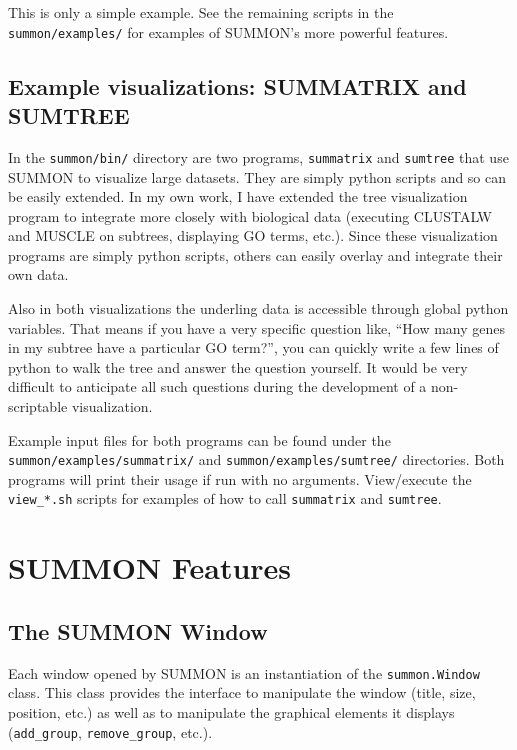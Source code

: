 \documentclass[12pt]{article}
\newcommand{\code}[1]{{\tt #1}}
\newcommand{\comment}[1]{}
\begin{document}
This is only a simple example.  See the remaining scripts in the 
\code{summon/examples/} for examples of SUMMON's more powerful features.



\subsection{Example visualizations: SUMMATRIX and SUMTREE}

In the \code{summon/bin/} directory are two programs, \code{summatrix} and
\code{sumtree} that use SUMMON to visualize large datasets.  They are simply 
python scripts and so can be easily extended.  In my own work, I have 
extended the tree visualization program to integrate more closely with
biological data (executing CLUSTALW and MUSCLE on subtrees, displaying GO terms,
etc.).  Since these visualization programs are simply python scripts,
others can easily overlay and integrate their own data.  

Also in both visualizations the underling data is accessible through global
python variables.  That means if you have a very specific question like, ``How
many genes in my subtree have a particular GO term?'', you can quickly write a
few lines of python to walk the tree and answer the question yourself.  It would
be very difficult to anticipate all such questions during the development of a
non-scriptable visualization.

Example input files for both programs can be found under the 
\code{summon/examples/summatrix/} and \code{summon/examples/sumtree/}
directories. Both programs will print their usage if run with no arguments. 
View/execute the \code{view\_*.sh} scripts for examples of how to call
\code{summatrix} and  \code{sumtree}.


\section{SUMMON Features}

\subsection{The SUMMON Window}
    
Each window opened by SUMMON is an instantiation of the \code{summon.Window}
class. This class provides the interface to manipulate the window (title, size,
position, etc.) as well as to manipulate the graphical elements it  displays
(\code{add\_group}, \code{remove\_group}, etc.).  
\end{document}

